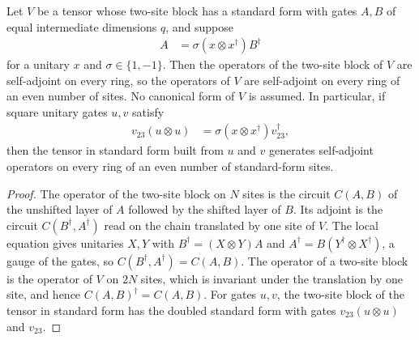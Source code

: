 \begin{lemma}
    \label{lem:mpu_local_time_reversal_certificate}
    \leanok
    Let $V$ be a tensor whose two-site block has a standard form with gates
    $A,B$ of equal intermediate dimensions $q$, and suppose
    \begin{align}
        A & =\sigma(x\otimes x^\dagger)B^\dagger
    \end{align}
    for a unitary $x$ and $\sigma\in\{1,-1\}$. Then the operators of the
    two-site block of $V$ are self-adjoint on every ring, so the operators of
    $V$ are self-adjoint on every ring of an even number of sites. No canonical
    form of $V$ is assumed. In particular, if square unitary gates $u,v$ satisfy
    \begin{align}
        v_{23}(u\otimes u) & =\sigma(x\otimes x^\dagger)v_{23}^\dagger,
    \end{align}
    then the tensor in standard form built from $u$ and $v$ generates
    self-adjoint operators on every ring of an even number of standard-form
    sites.
\end{lemma}

\begin{proof}\leanok
    The operator of the two-site block on $N$ sites is the circuit
    $C(A,B)$ of the unshifted layer of $A$ followed by the shifted layer of
    $B$. Its adjoint is the circuit $C(B^\dagger,A^\dagger)$ read on the chain
    translated by one site of $V$. The local equation gives unitaries $X,Y$ with
    $B^\dagger=(X\otimes Y)A$ and $A^\dagger=B(Y^\dagger\otimes X^\dagger)$, a
    gauge of the gates, so $C(B^\dagger,A^\dagger)=C(A,B)$. The operator of a
    two-site block is the operator of $V$ on $2N$ sites, which is invariant under
    the translation by one site, and hence $C(A,B)^\dagger=C(A,B)$. For gates
    $u,v$, the two-site block of the tensor in standard form has the doubled
    standard form with gates $v_{23}(u\otimes u)$ and $v_{23}$.
\end{proof}

